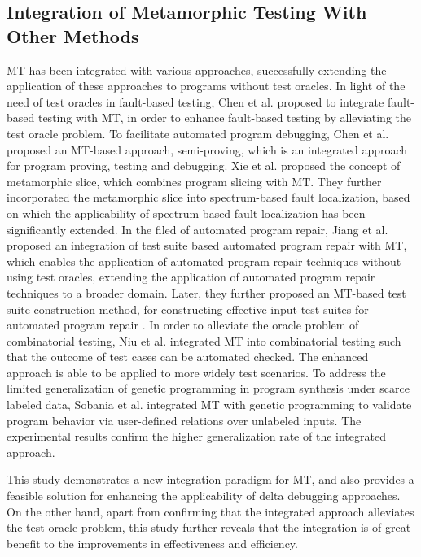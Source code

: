 \subsection{Integration of Metamorphic Testing With Other Methods}
MT has been integrated with various approaches, successfully extending the application of these approaches to programs without test oracles.
In light of the need of test oracles in fault-based testing, Chen et al. \cite{Chen01} proposed to integrate fault-based testing with MT, in order to enhance fault-based testing by alleviating the test oracle problem. 
To facilitate automated program debugging, Chen et al. \cite{Chen2011} proposed an MT-based approach, semi-proving, which is an integrated approach for program proving, testing and debugging.
Xie et al. \cite{Xie2013} proposed the concept of metamorphic slice, which combines program slicing with MT.
They further incorporated the metamorphic slice into spectrum-based fault localization, based on which the applicability of spectrum based fault localization has been significantly extended.
In the filed of automated program repair, Jiang et al. \cite{Jiang2016} proposed an integration of test suite based automated program repair with MT, which enables the application of automated program repair techniques without using test oracles, extending the application of automated program repair techniques to a broader domain.
Later, they further proposed an MT-based test suite construction method, for constructing effective input test suites for automated program repair \cite{Jiang2021}. 
In order to alleviate the oracle problem of combinatorial testing, Niu et al. \cite{niu2021} integrated MT into combinatorial testing such that the outcome of test cases can be automated checked.
The enhanced approach is able to be applied to more widely test scenarios.
To address the limited generalization of genetic programming in program synthesis under scarce labeled data, Sobania et al. \cite{sobania2023} integrated MT with genetic programming to validate program behavior via user-defined relations over unlabeled inputs.
The experimental results confirm the higher generalization rate of the integrated approach.

This study demonstrates a new integration paradigm for MT, and also provides a feasible solution for enhancing the applicability of delta debugging approaches.
On the other hand, apart from confirming that the integrated approach alleviates the test oracle problem, this study further reveals that the integration is of great benefit to the improvements in effectiveness and efficiency.







